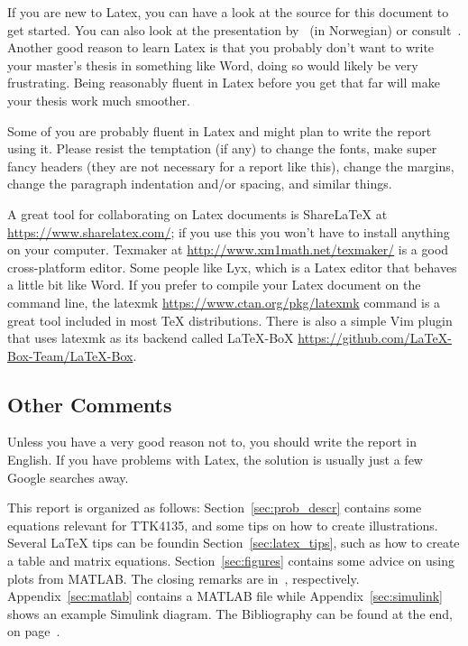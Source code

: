 If you are new to Latex, you can have a look at the source for this document to get started. You can also look at the presentation by~\cite{Berland2010} (in Norwegian) or consult~\cite{Oetiker2011}. Another good reason to learn Latex is that you probably don't want to write your master's thesis in something like Word, doing so would likely be very frustrating. Being reasonably fluent in Latex before you get that far will make your thesis work much smoother.

Some of you are probably fluent in Latex and might plan to write the report using it. Please resist the temptation (if any) to change the fonts, make super fancy headers (they are not necessary for a report like this), change the margins, change the paragraph indentation and/or spacing, and similar things.

A great tool for collaborating on Latex documents is ShareLaTeX at \url{https://www.sharelatex.com/}; if you use this you won't have to install anything on your computer. Texmaker at \url{http://www.xm1math.net/texmaker/} is a good cross-platform editor. Some people like Lyx, which is a Latex editor that behaves a little bit like Word. If you prefer to compile your Latex document on the command line, the latexmk \url{https://www.ctan.org/pkg/latexmk} command is a great tool included in most TeX distributions. There is also a simple Vim plugin that uses latexmk as its backend called LaTeX-BoX \url{https://github.com/LaTeX-Box-Team/LaTeX-Box}.

\subsection{Other Comments}
Unless you have a very good reason not to, you should write the report in English. If you have problems with Latex, the solution is usually just a few Google searches away.

This report is organized as follows: Section~\ref{sec:prob_descr} contains some equations relevant for TTK4135, and some tips on how to create illustrations. Several \LaTeX{} tips can be foundin Section~\ref{sec:latex_tips}, such as how to create a table and matrix equations. Section~\ref{sec:figures} contains some advice on using plots from MATLAB\@. The closing remarks are in~, respectively. Appendix~\ref{sec:matlab} contains a MATLAB file while Appendix~\ref{sec:simulink} shows an example Simulink diagram. The Bibliography can be found at the end, on page~\pageref{sec:bibliography}.
